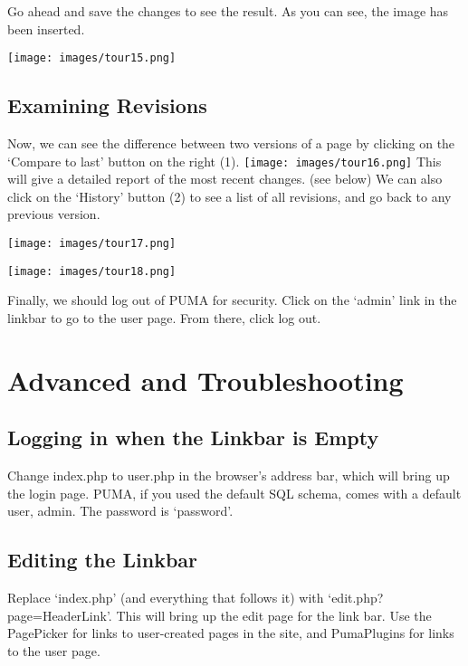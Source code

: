 \documentclass[12pt]{article}
\begin{document}
Go ahead and save the changes to see the result. As you can see, the image has been inserted.

\texttt{[image: images/tour15.png]}

\subsection*{Examining Revisions}

Now, we can see the difference between two versions of a page by clicking on the `Compare to last' button on the right (1). \texttt{[image: images/tour16.png]}  This will give a detailed report of the most recent changes. (see below) We can also click on the `History' button (2) to see a list of all revisions, and go back to any previous version.

\texttt{[image: images/tour17.png]} 

\texttt{[image: images/tour18.png]} 

 Finally, we should log out of PUMA for security. Click on the `admin' link in the linkbar to go to the user page. From there, click log out.

\section*{Advanced and Troubleshooting}

\subsection*{Logging in when the Linkbar is Empty}

Change index.php to user.php in the browser's address bar, which will bring up the login page. PUMA, if you used the default SQL schema, comes with a default user, admin. The password is `password'.

\subsection*{Editing the Linkbar}

Replace `index.php' (and everything that follows it) with `edit.php?page=HeaderLink'. This will bring up the edit page for the link bar. Use the PagePicker for links to user-created pages in the site, and PumaPlugins for links to the user page.
\end{document}
